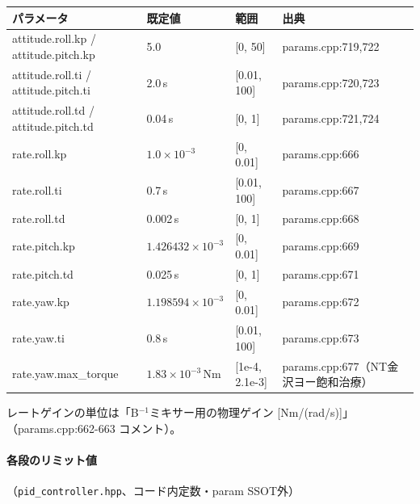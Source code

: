\documentclass[a4paper,10pt]{ltjsarticle}
\begin{document}
\begin{table}[h]
\centering\footnotesize
\begin{tabularx}{\textwidth}{@{}lllY@{}}
\toprule
パラメータ & 既定値 & 範囲 & 出典 \\
\midrule
attitude.roll.kp / attitude.pitch.kp & 5.0 & [0, 50] & params.cpp:719,722 \\
attitude.roll.ti / attitude.pitch.ti & 2.0\,s & [0.01, 100] & params.cpp:720,723 \\
attitude.roll.td / attitude.pitch.td & 0.04\,s & [0, 1] & params.cpp:721,724 \\
rate.roll.kp & $1.0\times10^{-3}$ & [0, 0.01] & params.cpp:666 \\
rate.roll.ti & 0.7\,s & [0.01, 100] & params.cpp:667 \\
rate.roll.td & 0.002\,s & [0, 1] & params.cpp:668 \\
rate.pitch.kp & $1.426432\times10^{-3}$ & [0, 0.01] & params.cpp:669 \\
rate.pitch.td & 0.025\,s & [0, 1] & params.cpp:671 \\
rate.yaw.kp & $1.198594\times10^{-3}$ & [0, 0.01] & params.cpp:672 \\
rate.yaw.ti & 0.8\,s & [0.01, 100] & params.cpp:673 \\
rate.yaw.max\_torque & $1.83\times10^{-3}$\,Nm & [1e-4, 2.1e-3] & params.cpp:677（NT金沢ヨー飽和治療） \\
\bottomrule
\end{tabularx}
\end{table}

レートゲインの単位は「B$^{-1}$ミキサー用の物理ゲイン [Nm/(rad/s)]」（params.cpp:662-663 コメント）。

\paragraph{各段のリミット値}（\texttt{pid\_controller.hpp}、コード内定数・param SSOT外）
\end{document}
